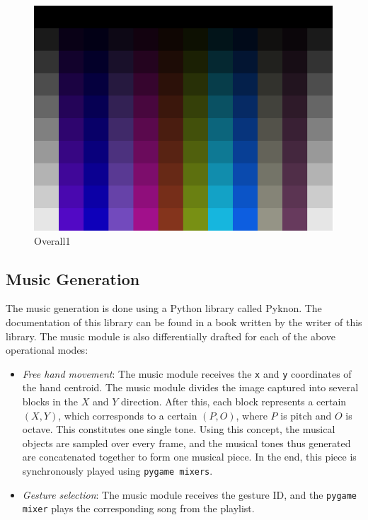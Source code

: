 \documentclass[letterpaper, 10 pt, twoside, conference]{ieeeconf}
\begin{document}
  \begin{figure}[h]
    \centering
    \includegraphics[width=\columnwidth]{wallpaper.png}
    \caption{Overall1}
    \label{Overall1}
  \end{figure}
\subsection{Music Generation}
  The music generation is done using a Python library called Pyknon. The documentation of this library can be found
  in a book written by the writer of this library. The music module is also differentially drafted for each 
  of the above operational modes:
  \begin{itemize}
    \item \textit{Free hand movement}: The music module receives the \texttt{x} and \texttt{y} coordinates
      of the hand centroid. The music module divides the image captured into several blocks in the $X$ and $Y$
      direction. After this, each block represents a certain $(X,Y)$, which corresponds to a certain $(P,O)$,
      where $P$ is pitch and $O$ is octave. This constitutes one single tone.
      Using this concept, the musical objects are sampled over every frame, and the musical tones thus generated are
      concatenated together to form one musical piece. In the end, this piece is synchronously played using
      \texttt{pygame mixers}.
      \par\null\par
    \item \textit{Gesture selection}: The music module receives the gesture ID, and the \texttt{pygame mixer}
      plays the corresponding song from the playlist.
    \end{itemize}
\end{document}
